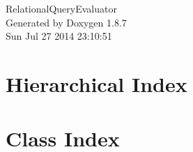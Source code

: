 \documentclass[twoside]{book}
\newcommand{\+}{\discretionary{\mbox{\scriptsize$\hookleftarrow$}}{}{}}
\newcommand{\clearemptydoublepage}{%
  \newpage{\pagestyle{empty}\cleardoublepage}%
}
\begin{document}
\hypersetup{pageanchor=false,
             bookmarks=true,
             bookmarksnumbered=true,
             pdfencoding=unicode
            }
\begin{titlepage}
\vspace*{7cm}
\begin{center}%
{\Large Relational\+Query\+Evaluator }\\
\vspace*{1cm}
{\large Generated by Doxygen 1.8.7}\\
\vspace*{0.5cm}
{\small Sun Jul 27 2014 23:10:51}\\
\end{center}
\end{titlepage}
\clearemptydoublepage
\tableofcontents
\clearemptydoublepage
{}
\hypersetup{pageanchor=true}

\chapter{Hierarchical Index}

\chapter{Class Index}

\end{document}
